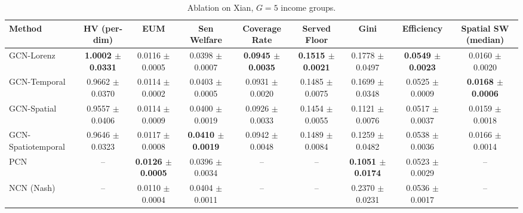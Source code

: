 \begin{table}[htbp]
\centering
\caption{Ablation on Xian, $G=5$ income groups.}
\label{tab:ablation_xian_g5}
\begin{tabular}{lcccccccc}
\toprule
Method & HV (per-dim) & EUM & Sen Welfare & Coverage Rate & Served Floor & Gini & Efficiency & Spatial SW (median) \\
\midrule
GCN-Lorenz & \textbf{1.0002 $\pm$ 0.0331} & 0.0116 $\pm$ 0.0005 & 0.0398 $\pm$ 0.0007 & \textbf{0.0945 $\pm$ 0.0035} & \textbf{0.1515 $\pm$ 0.0021} & 0.1778 $\pm$ 0.0497 & \textbf{0.0549 $\pm$ 0.0023} & 0.0160 $\pm$ 0.0020 \\
GCN-Temporal & 0.9662 $\pm$ 0.0370 & 0.0114 $\pm$ 0.0002 & 0.0403 $\pm$ 0.0005 & 0.0931 $\pm$ 0.0020 & 0.1485 $\pm$ 0.0075 & 0.1699 $\pm$ 0.0348 & 0.0525 $\pm$ 0.0009 & \textbf{0.0168 $\pm$ 0.0006} \\
GCN-Spatial & 0.9557 $\pm$ 0.0406 & 0.0114 $\pm$ 0.0009 & 0.0400 $\pm$ 0.0019 & 0.0926 $\pm$ 0.0033 & 0.1454 $\pm$ 0.0055 & 0.1121 $\pm$ 0.0076 & 0.0517 $\pm$ 0.0037 & 0.0159 $\pm$ 0.0018 \\
GCN-Spatiotemporal & 0.9646 $\pm$ 0.0323 & 0.0117 $\pm$ 0.0008 & \textbf{0.0410 $\pm$ 0.0019} & 0.0942 $\pm$ 0.0048 & 0.1489 $\pm$ 0.0084 & 0.1259 $\pm$ 0.0482 & 0.0538 $\pm$ 0.0036 & 0.0166 $\pm$ 0.0014 \\
PCN & -- & \textbf{0.0126 $\pm$ 0.0005} & 0.0396 $\pm$ 0.0034 & -- & -- & \textbf{0.1051 $\pm$ 0.0174} & 0.0523 $\pm$ 0.0029 & -- \\
NCN (Nash) & -- & 0.0110 $\pm$ 0.0004 & 0.0404 $\pm$ 0.0011 & -- & -- & 0.2370 $\pm$ 0.0231 & 0.0536 $\pm$ 0.0017 & -- \\
\bottomrule
\end{tabular}
\end{table}


